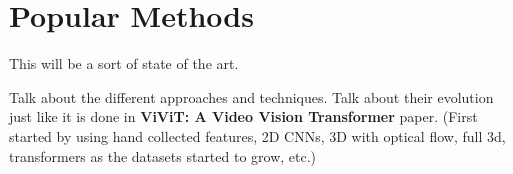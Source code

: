 \section{Popular Methods}

This will be a sort of state of the art.

Talk about the different approaches and techniques. Talk about their evolution just like it is done in \textbf{ViViT: A Video Vision Transformer} paper. (First started by using hand collected features, 2D CNNs, 3D with optical flow, full 3d, transformers as the datasets started to grow, etc.)

\lipsum[1-2]